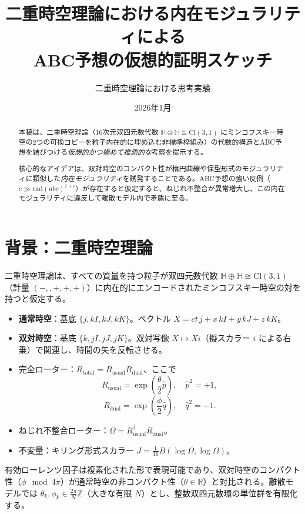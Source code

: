 \documentclass[dvipdfmx,a4paper]{article}
\title{二重時空理論における内在モジュラリティによる\\ABC予想の仮想的証明スケッチ}
\author{二重時空理論における思考実験}
\date{2026年1月}
\begin{document}

\maketitle

\begin{abstract}
本稿は、二重時空理論（16次元双四元数代数 $\mathbb{H} \oplus \mathbb{H} \cong \mathrm{Cl}(3,1)$ にミンコフスキー時空の2つの可換コピーを粒子内在的に埋め込む非標準枠組み）の代数的構造とABC予想を結びつける\emph{仮想的かつ極めて推測的な}考察を提示する。

核心的なアイデアは、双対時空のコンパクト性が楕円曲線や保型形式のモジュラリティに類似した\emph{内在モジュラリティ}を誘発することである。ABC予想の強い反例（$c \gg \mathrm{rad}(abc)^{1+\epsilon}$）が存在すると仮定すると、ねじれ不整合が異常増大し、この内在モジュラリティに違反して離散モデル内で矛盾に至る。
\end{abstract}

\section{背景：二重時空理論}

二重時空理論は、すべての質量を持つ粒子が双四元数代数 $\mathbb{H} \oplus \mathbb{H} \cong \mathrm{Cl}(3,1)$（計量 $(-,,+,+,+)$）に内在的にエンコードされたミンコフスキー時空の対を持つと仮定する。

\begin{itemize}
  \item \textbf{通常時空}：基底 $\{j, kI, kJ, kK\}$。ベクトル $X = ct\, j + x\, kI + y\, kJ + z\, kK$。
  \item \textbf{双対時空}：基底 $\{k, jI, jJ, jK\}$。双対写像 $X \mapsto Xi$（擬スカラー $i$ による右乗）で関連し、時間の矢を反転させる。
  \item 完全ローター：$R_\text{total} = R_\text{usual} R_\text{dual}$、ここで
  \[
  R_\text{usual} = \exp\!\left(\frac{\theta}{2} \hat{p}\right), \quad \hat{p}^2 = +1,
  \]
  \[
  R_\text{dual} = \exp\!\left(\frac{\phi}{2} \hat{q}\right), \quad \hat{q}^2 = -1.
  \]
  \item ねじれ不整合ローター：$\Omega = R_\text{usual}^\dagger R_\text{dual}$。
  \item 不変量：キリング形式スカラー $J = \frac{1}{16} B(\log \Omega, \log \Omega)$。
\end{itemize}

有効ローレンツ因子は複素化された形で表現可能であり、双対時空のコンパクト性（$\phi \mod 4\pi$）が通常時空の非コンパクト性（$\theta \in \mathbb{R}$）と対比される。離散モデルでは $\theta_k, \phi_k \in \frac{2\pi}{N} \mathbb{Z}$（大きな有限 $N$）とし、整数双四元数環の単位群を有限化する。
\end{document}
